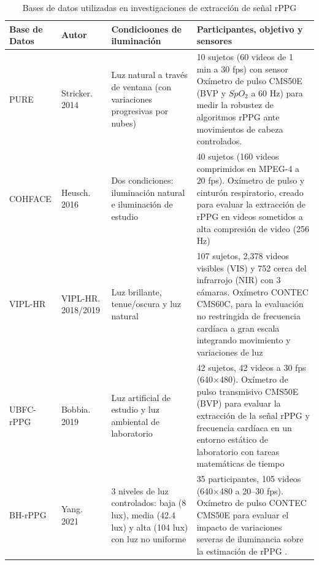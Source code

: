 \begin{longtable}{|p{2.5cm}|p{2.3cm}|p{3.2cm}|p{4.8cm}|}
    \caption{Bases de datos utilizadas en investigaciones de extracción de señal rPPG}
    \label{tab:bases_de_datos_video_rostro} \\
        \hline
        \textbf{Base de Datos}      & \textbf{Autor}        & \textbf{Condicioones de iluminación}                                    & \textbf{Participantes, objetivo y sensores}  \\ \hline
        PURE                        &  Stricker. 2014       & Luz natural a través de ventana (con variaciones progresivas por nubes) & 10 sujetos (60 videos de 1 min a 30 fps) con sensor Oxímetro de pulso CMS50E (BVP y $SpO_2$ a 60 Hz) para medir la robustez de algoritmos rPPG ante movimientos de cabeza controlados. \cite{chang2025physvim, qiao2022revise} \\ \hline
        COHFACE                     &  Heusch. 2016         & Dos condiciones: iluminación natural e iluminación de estudio           & 40 sujetos (160 videos comprimidos en MPEG-4 a 20 fps). Oxímetro de pulso y cinturón respiratorio, creado para evaluar la extracción de rPPG en videos sometidos a alta compresión de video (256 Hz) \cite{zhan2026hrv_long,transphys2023} \\ \hline
        VIPL-HR                     &  VIPL-HR. 2018/2019   & Luz brillante, tenue/oscura y luz natural                               & 107 sujetos, 2,378 videos visibles (VIS) y 752 cerca del infrarrojo (NIR) con 3 cámaras. Oxímetro CONTEC CMS60C, para la evaluación no restringida de frecuencia cardíaca a gran escala integrando movimiento y variaciones de luz \cite{yang2022image_en, yu2024rgbnir} \\ \hline
        UBFC-rPPG                   &  Bobbia. 2019         & Luz artificial de estudio y luz ambiental de laboratorio                & 42 sujetos, 42 videos a 30 fps (640×480). Oxímetro de pulso transmisivo CMS50E (BVP) para evaluar la extracción de la señal rPPG y frecuencia cardíaca en un entorno estático de laboratorio con tareas matemáticas de tiempo \cite{yang2022image_en, yang2022assessment_dl, zhan2026hrv_long} \\ \hline
        BH-rPPG                     &  Yang. 2021           & 3 niveles de luz controlados: baja (8 lux), media (42.4 lux) y alta (104 lux) con luz no uniforme &  35 participantes, 105 videos (640×480 a 20–30 fps). Oxímetro de pulso CONTEC CMS50E para evaluar el impacto de variaciones severas de iluminancia sobre la estimación de rPPG \cite{yang2022image_en, yang2022assessment_dl}. \\ \hline

\end{longtable}
